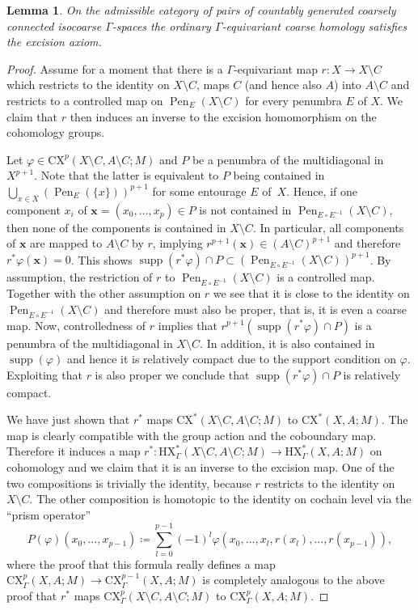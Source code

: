 \documentclass[pdftex]{sigma}
\numberwithin{equation}{section}
\newtheorem{lem}[thm]{Lemma}
\theoremstyle{definition}
\DeclareMathOperator{\supp}{supp}
\DeclareMathOperator{\Pen}{Pen}
\newcommand{\HX}{\mathrm{HX}}
\newcommand{\CX}{\mathrm{CX}}
\begin{document}
\begin{lem}
On the admissible category of pairs of countably generated coarsely connected isocoarse $\Gamma$-spaces the ordinary $\Gamma$-equivariant coarse homology satisfies the excision axiom.
\end{lem}
\begin{proof}
Assume for a moment that there is a $\Gamma$-equivariant map $r\colon X\to X\setminus C$ which restricts to the identity on $X\setminus C$, maps $C$ (and hence also $A$) into $A\setminus C$ and restricts to a controlled map on $\Pen_E(X\setminus C)$ for every penumbra $E$ of $X$.
We claim that $r$ then induces an inverse to the excision homomorphism on the cohomology groups.

Let $\varphi\in\CX^p(X\setminus C,A\setminus C;M)$ and $P$ be a penumbra of the multidiagonal in $X^{p+1}$. Note that the latter is equivalent to $P$ being contained in $\bigcup_{x\in X}(\Pen_E(\{x\}))^{p+1}$ for some entourage $E$ of~$X$.
Hence, if one component $x_i$ of $\mathbf{x}=(x_0,\dots,x_p)\in P$ is not contained in $\Pen_{E\circ E^{-1}}(X\setminus C)$, then none of the components is contained in $X\setminus C$. In particular, all components of $\mathbf{x}$ are mapped to $A\setminus C$ by $r$, implying $r^{p+1}(\mathbf{x})\in(A\setminus C)^{p+1}$ and therefore $r^*\varphi(\mathbf{x})=0$.
This shows $\supp(r^*\varphi)\cap P\subset (\Pen_{E\circ E^{-1}}(X\setminus C))^{p+1}$. By assumption, the restriction of $r$ to $\Pen_{E\circ E^{-1}}(X\setminus C)$ is a controlled map. Together with the other assumption on $r$ we see that it is close to the identity on $\Pen_{E\circ E^{-1}}(X\setminus C)$ and therefore must also be proper, that is, it is even a coarse map. Now, controlledness of $r$ implies that $r^{p+1}(\supp(r^*\varphi)\cap P)$ is a penumbra of the multidiagonal in $X\setminus C$. In addition, it is also contained in $\supp(\varphi)$ and hence it is relatively compact due to the support condition on $\varphi$. Exploiting that $r$ is also proper we conclude that $\supp(r^*\varphi)\cap P$ is relatively compact.

We have just shown that $r^*$ maps $\CX^*(X\setminus C,A\setminus C;M)$ to $\CX^*(X,A;M)$. The map is clearly compatible with the group action and the coboundary map. Therefore it induces a map $r^*\colon \HX_\Gamma^*(X\setminus C,A\setminus C;M)\to\HX_\Gamma^*(X,A;M)$ on cohomology and we claim that it is an inverse to the excision map. One of the two compositions is trivially the identity, because $r$ restricts to the identity on $X\setminus C$. The other composition is homotopic to the identity on cochain level via the ``prism operator''
\[
P(\varphi)(x_0,\dots,x_{p-1})\coloneqq\sum_{l=0}^{p-1}(-1)^l\varphi(x_0,\dots,x_l,r(x_l),\dots,r(x_{p-1})),
\]
where the proof that this formula really defines a map $\CX_\Gamma^p(X,A;M)\to\CX_\Gamma^{p-1}(X,A;M)$ is completely analogous to the above proof that $r^*$ maps $\CX_\Gamma^p(X\setminus C,A\setminus C;M)$ to $\CX_\Gamma^p(X,A;M)$.



\end{proof}
\end{document}
